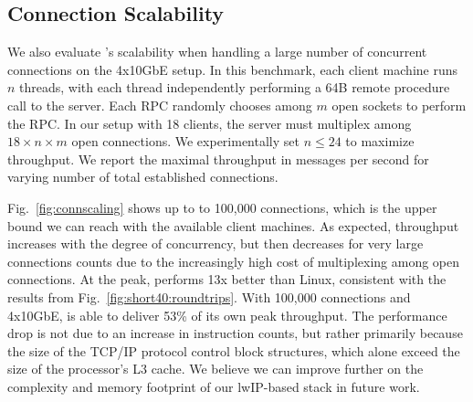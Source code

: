 \subsection{Connection Scalability}

\label{sec:eval:scale}

We also evaluate \ix's scalability when handling a large number of
concurrent connections on the 4x10GbE setup. In this benchmark, each client machine runs
$n$ threads, with each thread independently performing a 64B remote
procedure call to the server.  Each RPC randomly chooses among $m$
open sockets to perform the RPC.  In our setup with 18 clients, the
server must multiplex among $18 \times n \times m$ open connections.
We experimentally set $n \leq 24$ to maximize throughput.  We report
the maximal throughput in messages per second for varying number of
total established connections.



Fig.~\ref{fig:connscaling} shows up to to 100,000 connections, which
is the upper bound we can reach with the available client machines.
As expected, throughput increases with the degree of concurrency, but
then decreases for very large connections counts due to the
increasingly high cost of multiplexing among open connections.  At the
peak, \ix performs 13x better than Linux, consistent with the results
from Fig.~\ref{fig:short40:roundtrips}.  With 100,000 connections and
4x10GbE, \ix is able to deliver 53\% of its own peak throughput.  The
performance drop is not due to an increase in instruction counts, but
rather primarily because the size of the TCP/IP protocol control block
structures, which alone exceed the size of the processor's L3
cache. We believe we can improve further on the complexity and memory
footprint of our lwIP-based stack in future work. 


